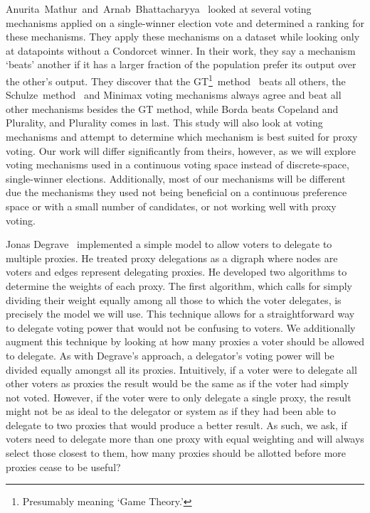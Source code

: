 Anurita~Mathur~and~Arnab~Bhattacharyya~\cite{Mathur2017} looked at several voting
mechanisms applied on a single-winner election vote and determined a ranking for
these mechanisms.
They apply these mechanisms on a dataset while looking only at datapoints without a
Condorcet winner.
In their work, they say a mechanism `beats' another if it has a larger fraction of
the population prefer its output over the other's output.
They discover that the GT\footnote{
    Presumably meaning `Game Theory.'
}~method~\cite{Rivest2010} beats all others, the Schulze~method~\cite{Schulze2011}
and Minimax voting mechanisms always agree and beat all other mechanisms besides the
GT method, while Borda beats Copeland and Plurality, and Plurality comes in last.
This study will also look at voting mechanisms and attempt to determine which
mechanism is best suited for proxy voting.
Our work will differ significantly from theirs, however, as we will explore voting
mechanisms used in a continuous voting space instead of discrete-space, single-winner
elections.
Additionally, most of our mechanisms will be different due the mechanisms they used
not being beneficial on a continuous preference space or with a small number of
candidates, or not working well with proxy voting.

Jonas Degrave~\cite{Degrave2014} implemented a simple model to allow voters to
delegate to multiple proxies.
He treated proxy delegations as a digraph where nodes are voters and edges represent
delegating proxies.
He developed two algorithms to determine the weights of each proxy.
The first algorithm, which calls for simply dividing their weight equally among all
those to which the voter delegates, is precisely the model we will use.
This technique allows for a straightforward way to delegate voting power that would
not be confusing to voters.
We additionally augment this technique by looking at how many proxies a voter should be
allowed to delegate.
As with Degrave's approach, a delegator's voting power will be divided equally amongst
all its proxies.
Intuitively, if a voter were to delegate all other voters as proxies the result would
be the same as if the voter had simply not voted.
However, if the voter were to only delegate a single proxy, the result might not be
as ideal to the delegator or system as if they had been able to delegate to two proxies
that would produce a better result.
As such, we ask, if voters need to delegate more than one proxy with equal weighting and
will always select those closest to them, how many proxies should be allotted before
more proxies cease to be useful?

